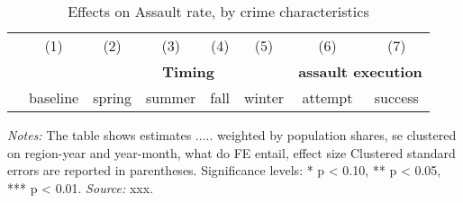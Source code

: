 \documentclass[11pt, a4paper, draft]{article} %
\begin{document}
\begin{landscape}
	\vspace*{\fill}
	\begin{table}[H] \centering 
		\begin{threeparttable} \centering \caption{Effects on Assault rate, by crime characteristics}
			\label{tab_soc_ext:reg_fe_assrate_crime_chars}
			{\def\sym#1{\ifmmode^{#1}\else\(^{#1}\)\fi} 
				\begin{tabular}{l*{7}{c}}
					\toprule 
					&\multicolumn{1}{c}{(1)}&\multicolumn{1}{c}{(2)}&\multicolumn{1}{c}{(3)}&\multicolumn{1}{c}{(4)}&\multicolumn{1}{c}{(5)}&\multicolumn{1}{c}{(6)} &\multicolumn{1}{c}{(7)}\\
					& & \multicolumn{4}{c}{\textbf{Timing}} & \multicolumn{2}{c}{\textbf{assault execution}} \\
					\cmidrule(lr){3-6} \cmidrule(lr){7-8}
					& baseline & spring & summer & fall & winter & attempt & success \\
					\midrule
					 
					\bottomrule 
			\end{tabular}}
			\begin{tablenotes} 
				\item \scriptsize \emph{Notes:} The table shows estimates ..... 
				weighted by population shares, se clustered on region-year and year-month, what do FE entail, effect size
				Clustered standard errors are reported in parentheses. \newline Significance levels: * p < 0.10, ** p < 0.05, *** p < 0.01. \newline 	\emph{Source:} xxx.
			\end{tablenotes} 
		\end{threeparttable} 
	\end{table}
	\vspace*{\fill}\clearpage 
\end{landscape}
\vspace*{\fill}
\end{document}
